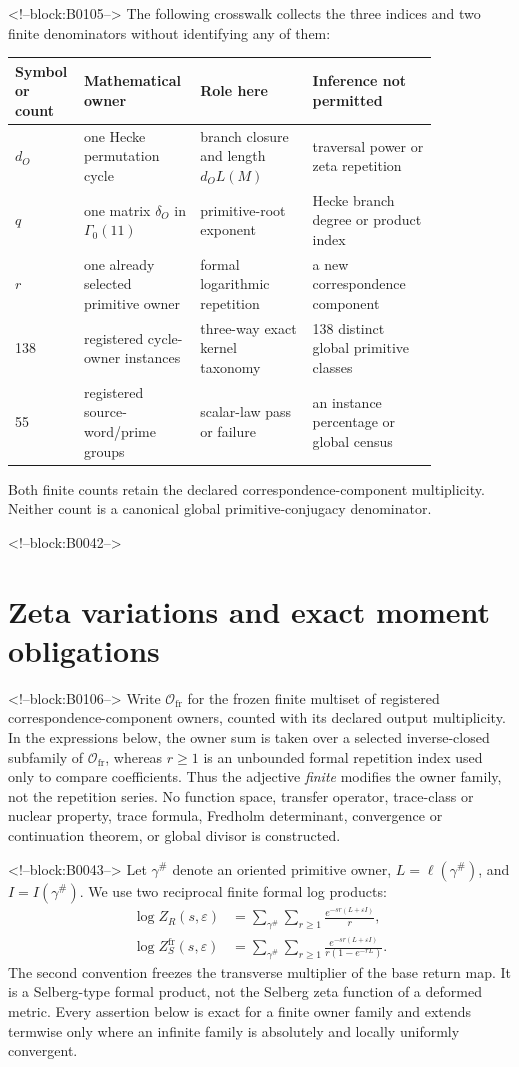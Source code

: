 \documentclass[11pt]{article}
\theoremstyle{definition}
\theoremstyle{remark}
\newcommand{\G}{\Gamma_0(11)}
\newcommand{\e}{\varepsilon}
\begin{document}
<!--block:B0105-->
The following crosswalk collects the three indices and two finite denominators without identifying any of them:
\begin{center}
\small
\begin{tabular}{p{0.10\linewidth}p{0.20\linewidth}p{0.25\linewidth}p{0.29\linewidth}}
\toprule
Symbol or count & Mathematical owner & Role here & Inference not permitted\\
\midrule
$d_O$ & one Hecke permutation cycle & branch closure and length $d_OL(M)$ & traversal power or zeta repetition\\
$q$ & one matrix $\delta_O$ in $\G$ & primitive-root exponent & Hecke branch degree or product index\\
$r$ & one already selected primitive owner & formal logarithmic repetition & a new correspondence component\\
138 & registered cycle-owner instances & three-way exact kernel taxonomy & 138 distinct global primitive classes\\
55 & registered source-word/prime groups & scalar-law pass or failure & an instance percentage or global census\\
\bottomrule
\end{tabular}
\end{center}
Both finite counts retain the declared correspondence-component multiplicity. Neither count is a canonical global primitive-conjugacy denominator.

<!--block:B0042-->
\section{Zeta variations and exact moment obligations}

<!--block:B0106-->
Write $\mathcal O_{\mathrm{fr}}$ for the frozen finite multiset of registered correspondence-component owners, counted with its declared output multiplicity. In the expressions below, the owner sum is taken over a selected inverse-closed subfamily of $\mathcal O_{\mathrm{fr}}$, whereas $r\geq1$ is an unbounded formal repetition index used only to compare coefficients. Thus the adjective \emph{finite} modifies the owner family, not the repetition series. No function space, transfer operator, trace-class or nuclear property, trace formula, Fredholm determinant, convergence or continuation theorem, or global divisor is constructed.

<!--block:B0043-->
Let $\gamma^\#$ denote an oriented primitive owner, $L=\ell(\gamma^\#)$, and $I=I(\gamma^\#)$. We use two reciprocal finite formal log products:
\begin{align}
\log Z_R(s,\e)
&=\sum_{\gamma^\#}\sum_{r\geq1}\frac{e^{-sr(L+\e I)}}r,\label{eq:ruelle}\\
\log Z_S^{\mathrm{fr}}(s,\e)
&=\sum_{\gamma^\#}\sum_{r\geq1}
\frac{e^{-sr(L+\e I)}}{r(1-e^{-rL})}.\label{eq:selberg}
\end{align}
The second convention freezes the transverse multiplier of the base return map. It is a Selberg-type formal product, not the Selberg zeta function of a deformed metric. Every assertion below is exact for a finite owner family and extends termwise only where an infinite family is absolutely and locally uniformly convergent.
\end{document}
